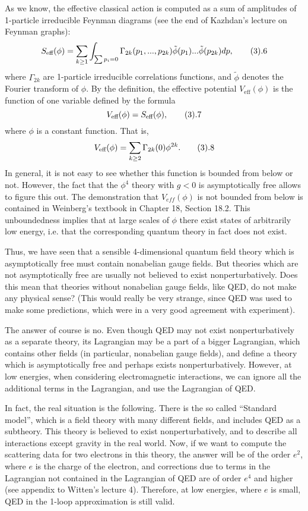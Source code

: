 As we know, the 
effective classical action is computed as 
a sum of amplitudes of 1-particle 
irreducible Feynman diagrams (see the end of 
Kazhdan's lecture on Feynman graphs):
$$
S_{\text{eff}}(\phi)=
\sum_{k\ge 1}\int_{\sum p_i=0}\Gamma_{2k}(p_1,...,p_{2k})
\tilde\phi(p_1)...\tilde\phi(p_{2k})dp,\tag 3.6
$$
where $\Gamma_{2k}$ are 1-particle irreducible correlations functions,
and $\tilde\phi$ denotes the Fourier transform of $\phi$. 
By the definition, the effective potential $V_{\text{eff}}(\phi)$ is 
the function of one variable defined by the formula
$$
V_{\text{eff}}(\phi)=S_{\text{eff}}(\phi),\tag 3.7 
$$
where $\phi$ is a constant function.
That is,
$$
V_{\text{eff}}(\phi)=\sum_{k\ge 2} \Gamma_{2k}(0)\phi^{2k}.\tag 3.8
$$
In general, it is not easy to see whether this function is bounded 
from below or not. However, the fact that the $\phi^4$ theory
with $g<0$ is asymptotically free allows to figure this out. 
The demonstration that $V_{eff}(\phi)$ is not bounded
from below is contained in Weinberg's textbook in Chapter 18, 
Section 18.2. 
This unboundedness implies that
at large scales of $\phi$ there exist states of arbitrarily low energy,
i.e. that the corresponding quantum theory in fact does not exist. 

Thus, we have seen that a sensible 
4-dimensional quantum field theory which is asymptotically free 
must contain nonabelian gauge fields. But theories which are 
not asymptotically free are usually not believed to exist
nonperturbatively. Does this mean that theories without nonabelian 
gauge fields, like QED, do not make any physical sense? 
(This would really be very 
strange, since QED was used to make some predictions, 
which were in a very good agreement with experiment). 

The answer of course is no. Even though QED may not exist nonperturbatively
as a separate theory, its Lagrangian may be a part of a bigger Lagrangian, 
which contains other fields (in particular, nonabelian gauge fields),
and define a theory which is asymptotically free and perhaps exists 
nonperturbatively. However, at low energies, when considering electromagnetic 
interactions, we can ignore all the additional terms in the Lagrangian, and
use the Lagrangian of QED. 

In fact, the real situation is the following. There is the so called
``Standard model'', which is a field theory with many different 
fields, and includes QED as a subtheory. This theory is believed to 
exist nonperturbatively, and to describe all interactions except 
gravity in the real world. Now, if we want to compute the scattering 
data for two electrons in this theory, the answer will be of the order
$e^2$, where $e$ is the charge of the electron, and 
corrections due to terms in the Lagrangian not contained in the 
Lagrangian of QED are of order $e^4$ and higher
(see appendix to Witten's lecture 4). Therefore, at
low energies, where $e$ is small, QED in the 1-loop approximation is still 
valid.  

